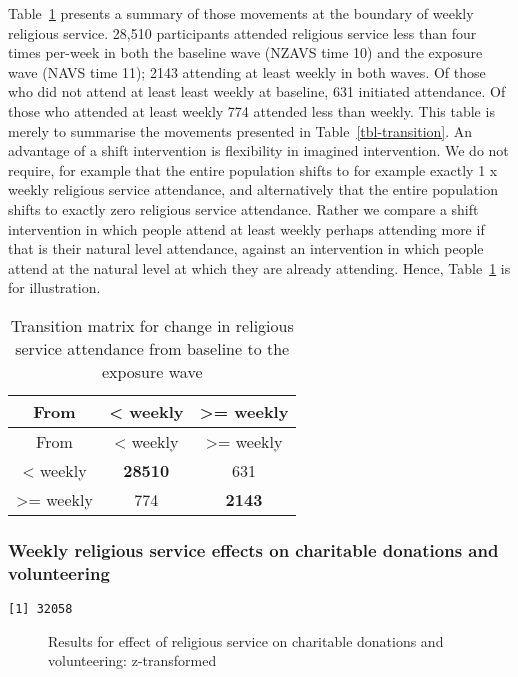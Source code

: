 \documentclass[
  singlecolumn]{article}
\begin{document}
Table~\ref{tbl-transition-2} presents a summary of those movements at
the boundary of weekly religious service. 28,510 participants attended
religious service less than four times per-week in both the baseline
wave (NZAVS time 10) and the exposure wave (NAVS time 11); 2143
attending at least weekly in both waves. Of those who did not attend at
least least weekly at baseline, 631 initiated attendance. Of those who
attended at least weekly 774 attended less than weekly. This table is
merely to summarise the movements presented in
Table~\ref{tbl-transition}. An advantage of a shift intervention is
flexibility in imagined intervention. We do not require, for example
that the entire population shifts to for example exactly 1 x weekly
religious service attendance, and alternatively that the entire
population shifts to exactly zero religious service attendance. Rather
we compare a shift intervention in which people attend at least weekly
perhaps attending more if that is their natural level attendance,
against an intervention in which people attend at the natural level at
which they are already attending. Hence, Table~\ref{tbl-transition-2} is
for illustration.

\begin{longtable}[]{@{}ccc@{}}
\caption{Transition matrix for change in religious service attendance
from baseline to the exposure
wave}\label{tbl-transition-2}\tabularnewline
\toprule\noalign{}
From & \textless{} weekly & \textgreater= weekly \\
\midrule\noalign{}
\endfirsthead
\toprule\noalign{}
From & \textless{} weekly & \textgreater= weekly \\
\midrule\noalign{}
\endhead
\bottomrule\noalign{}
\endlastfoot
\textless{} weekly & \textbf{28510} & 631 \\
\textgreater= weekly & 774 & \textbf{2143} \\
\end{longtable}

\subsubsection{Weekly religious service effects on charitable donations
and
volunteering}\label{weekly-religious-service-effects-on-charitable-donations-and-volunteering}

\begin{verbatim}
[1] 32058
\end{verbatim}

\begin{figure}


\caption{\label{fig-results-church-on-prosociality}Results for effect of
religious service on charitable donations and volunteering:
z-transformed}

\end{figure}%
\end{document}
